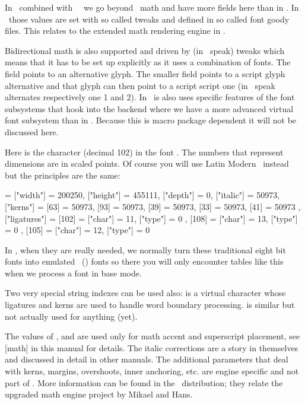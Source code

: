 In \LUAMETATEX\ combined with \CONTEXT\ \MKXL\ we go beyond \OPENTYPE\ math and
have more fields here than in \LUATEX. In \CONTEXT\ those values are set with so
called tweaks and defined in so called font goody files. This relates to the
extended math rendering engine in \LUAMETATEX.

Bidirectional math is also supported and driven by (in \CONTEXT\ speak) tweaks
which means that it has to be set up explicitly as it uses a combination of
fonts. The  field points to an alternative glyph. The \type
{smaller} field points to a script glyph alternative and that glyph can then
point to a script script one (in \OPENTYPE\ speak  alternates
respectively one 1 and 2). In \CONTEXT\ is also uses specific features of the
font subsystems that hook into the backend where we have a more advanced virtual
font subsystem than in \LUATEX. Because this is macro package dependent it will
not be discussed here.

Here is the character  (decimal 102) in the font .
The numbers that represent dimensions are in scaled points. Of course you will
use Latin Modern \OPENTYPE\ instead but the principles are the same:

\starttyping[option=LUA]
[102] = {
    ["width"]  = 200250,
    ["height"] = 455111,
    ["depth"]  = 0,
    ["italic"] = 50973,
    ["kerns"]  = {
        [63] = 50973,
        [93] = 50973,
        [39] = 50973,
        [33] = 50973,
        [41] = 50973
    },
    ["ligatures"] = {
        [102] = { ["char"] = 11, ["type"] = 0 },
        [108] = { ["char"] = 13, ["type"] = 0 },
        [105] = { ["char"] = 12, ["type"] = 0 }
    }
}
\stoptyping

In \CONTEXT, when they are really needed, we normally turn these traditional
eight bit fonts into emulated \OPENTYPE\ (\UNICODE) fonts so there you will only
encounter tables like this when we process a font in base mode.

Two very special string indexes can be used also:  is a
virtual character whose ligatures and kerns are used to handle word boundary
processing.  is similar but not actually used for anything
(yet).

The values of ,  and  are
used only for math accent and superscript placement, see  [math] in
this manual for details. The italic corrections are a story in themselves and
discussed in detail in other manuals. The additional parameters that deal with
kerns, margins, overshoots, inner anchoring, etc. are engine specific and not
part of \OPENTYPE. More information can be found in the \CONTEXT\ distribution;
they relate the upgraded math engine project by Mikael and Hans.

